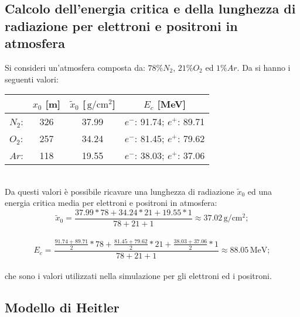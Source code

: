 \documentclass[10pt,a4paper,usenatbib]{article}
\newcommand*{\unit}[1]{\ensuremath{\mathrm{\,#1}}}                              %
\begin{document}
\subsection{Calcolo dell'energia critica e della lunghezza di radiazione per elettroni e positroni in atmosfera}
\label{appendix:a}
Si consideri un'atmosfera composta da: $78\% N_2$, $21\% O_2$ ed $1\% Ar$. Da \cite{Olive:2016xmw} si hanno i seguenti valori: 
\begin{table}[h!]
\centering
\begin{tabular}{lccc}
\toprule
                      &   $x_0$ [m]   &   $\tilde{x}_0$ [$\unit{g/cm^2}$]   &   $E_c$ [MeV]                  \\                          
\midrule
$N_2$:          &   326              &   37.99                               &  $e^-$: 91.74; $e^+$: 89.71        \\
$O_2$:          &   257              &   34.24                               &  $e^-$: 81.45; $e^+$: 79.62         \\
$Ar$:             &   118              &   19.55                               &  $e^-$: 38.03; $e^+$: 37.06          \\
\bottomrule
\end{tabular}
\end{table}
\\Da questi valori è possibile ricavare una lunghezza di radiazione $\tilde{x}_0$ ed una energia critica media per elettroni e positroni in atmosfera: \\
\begin{equation*}
\tilde{x}_0 = \frac{37.99*78+34.24*21+19.55*1}{78+21+1} \approx 37.02\unit{g/cm^2};
\end{equation*}
\\
\begin{equation*}
E_c = \frac{\frac{91.74 + 89.71}{2}*78+\frac{81.45 + 79.62}{2}*21+\frac{38.03 + 37.06}{2}*1}{78+21+1} \approx 88.05\unit{MeV};
\end{equation*}
\\che sono i valori utilizzati nella simulazione per gli elettroni ed i positroni. 


\subsection{Modello di Heitler}
\end{document}
